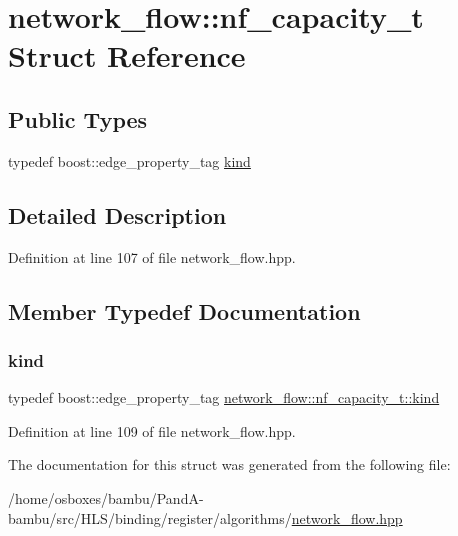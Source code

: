 \hypertarget{structnetwork__flow_1_1nf__capacity__t}{}\section{network\+\_\+flow\+:\+:nf\+\_\+capacity\+\_\+t Struct Reference}
\label{structnetwork__flow_1_1nf__capacity__t}
\subsection*{Public Types}
\begin{DoxyCompactItemize}
\item 
typedef boost\+::edge\+\_\+property\+\_\+tag \hyperlink{structnetwork__flow_1_1nf__capacity__t_a9f35fd541e0a0f7963470de761287a5a}{kind}
\end{DoxyCompactItemize}


\subsection{Detailed Description}


Definition at line 107 of file network\+\_\+flow.\+hpp.



\subsection{Member Typedef Documentation}
\mbox{\label{structnetwork__flow_1_1nf__capacity__t_a9f35fd541e0a0f7963470de761287a5a}} 
\subsubsection{\texorpdfstring{kind}{kind}}
{\footnotesize\ttfamily typedef boost\+::edge\+\_\+property\+\_\+tag \hyperlink{structnetwork__flow_1_1nf__capacity__t_a9f35fd541e0a0f7963470de761287a5a}{network\+\_\+flow\+::nf\+\_\+capacity\+\_\+t\+::kind}}



Definition at line 109 of file network\+\_\+flow.\+hpp.



The documentation for this struct was generated from the following file\+:\begin{DoxyCompactItemize}
\item 
/home/osboxes/bambu/\+Pand\+A-\/bambu/src/\+H\+L\+S/binding/register/algorithms/\hyperlink{network__flow_8hpp}{network\+\_\+flow.\+hpp}\end{DoxyCompactItemize}
